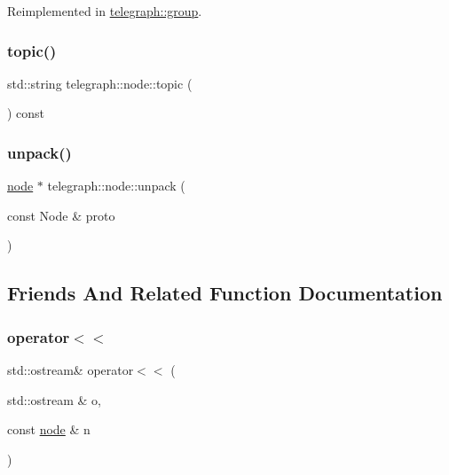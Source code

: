 Reimplemented in \hyperlink{classtelegraph_1_1group_af56fb03ad97aadd9be32c5e47c6d195b}{telegraph\+::group}.

\mbox{\label{classtelegraph_1_1node_a3cb6dfaddab4d5953c04bb5ec348763b}} 
\subsubsection{\texorpdfstring{topic()}{topic()}}
{\footnotesize\ttfamily std\+::string telegraph\+::node\+::topic (\begin{DoxyParamCaption}{ }\end{DoxyParamCaption}) const}

\mbox{\label{classtelegraph_1_1node_a2a2ddaf1b7210b1e69f63adcc1d83fa5}} 
\subsubsection{\texorpdfstring{unpack()}{unpack()}}
{\footnotesize\ttfamily \hyperlink{classtelegraph_1_1node}{node} $\ast$ telegraph\+::node\+::unpack (\begin{DoxyParamCaption}\item[{const Node \&}]{proto }\end{DoxyParamCaption})\hspace{0.3cm}{\ttfamily [static]}}



\subsection{Friends And Related Function Documentation}
\mbox{\label{classtelegraph_1_1node_ac75a0e79c8f8f6dfa9fa8cd9d438325f}} 
\subsubsection{\texorpdfstring{operator$<$$<$}{operator<<}}
{\footnotesize\ttfamily std\+::ostream\& operator$<$$<$ (\begin{DoxyParamCaption}\item[{std\+::ostream \&}]{o,  }\item[{const \hyperlink{classtelegraph_1_1node}{node} \&}]{n }\end{DoxyParamCaption})\hspace{0.3cm}{\ttfamily [friend]}}



